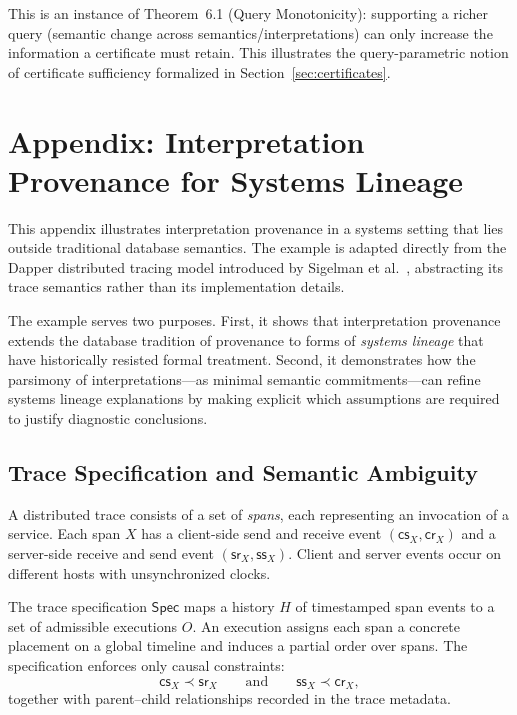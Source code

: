 \documentclass[acmsmall,nonacm]{acmart}
\theoremstyle{remark}
\numberwithin{definition}{section}
\numberwithin{theorem}{section}
\numberwithin{lemma}{section}
\numberwithin{corollary}{section}
\numberwithin{remark}{section}
\numberwithin{example}{section}
\numberwithin{observation}{section}
\numberwithin{assumption}{section}
\newcommand{\Spec}{\mathsf{Spec}}
\begin{document}
This is an instance of Theorem~6.1 (Query Monotonicity): supporting a richer query (semantic change across semantics/interpretations) can only increase the information a certificate must retain. This illustrates the query-parametric notion of certificate sufficiency formalized in Section~\ref{sec:certificates}.

\section{Appendix: Interpretation Provenance for Systems Lineage}
\label{app:systems-lineage}

This appendix illustrates interpretation provenance in a systems setting that
lies outside traditional database semantics.
The example is adapted directly from the Dapper distributed tracing model
introduced by Sigelman et al.~\cite{sigelman2010dapper}, abstracting its trace
semantics rather than its implementation details.

The example serves two purposes.
First, it shows that interpretation provenance extends the database tradition of
provenance to forms of \emph{systems lineage} that have historically resisted
formal treatment.
Second, it demonstrates how the parsimony of interpretations---as minimal semantic
commitments---can refine systems lineage explanations by making explicit which
assumptions are required to justify diagnostic conclusions.

\subsection{Trace Specification and Semantic Ambiguity}

A distributed trace consists of a set of \emph{spans}, each representing an
invocation of a service.
Each span $X$ has a client-side send and receive event
$(\mathsf{cs}_X,\mathsf{cr}_X)$ and a server-side receive and send event
$(\mathsf{sr}_X,\mathsf{ss}_X)$.
Client and server events occur on different hosts with unsynchronized clocks.

The trace specification $\Spec$ maps a history $H$ of timestamped span events to a
set of admissible executions $O$.
An execution assigns each span a concrete placement on a global timeline and
induces a partial order over spans.
The specification enforces only causal constraints:
\[
  \mathsf{cs}_X \prec \mathsf{sr}_X
  \qquad\text{and}\qquad
  \mathsf{ss}_X \prec \mathsf{cr}_X ,
\]
together with parent--child relationships recorded in the trace metadata.
\end{document}
